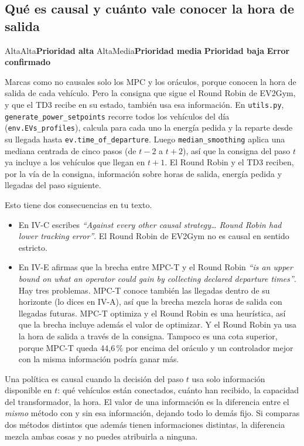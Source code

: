 \documentclass[11pt]{article}
\newcommand{\prioridad}[1]{%
  \def\tmpA{Alta}\def\tmpM{Media}\def\tmp{#1}%
  \ifx\tmp\tmpA\colorbox{rojoerror}{\color{white}\small\bfseries Prioridad alta}%
  \else\ifx\tmp\tmpM\colorbox{naranjatarea}{\color{white}\small\bfseries Prioridad media}%
  \else\colorbox{azulidea}{\color{white}\small\bfseries Prioridad baja}\fi\fi}
\newcommand{\confirmado}{\colorbox{rojoerror!15}{\small\bfseries\color{rojoerror} Error confirmado}}
\begin{document}
\subsection{Qué es causal y cuánto vale conocer la hora de salida}
\prioridad{Alta} \confirmado

\begin{error}
Marcas como no causales solo los MPC y los oráculos, porque conocen la hora de salida de cada vehículo. Pero la consigna que sigue el Round Robin de EV2Gym, y que el TD3 recibe en su estado, también usa esa información. En \texttt{utils.py}, \texttt{generate\_power\_setpoints} recorre todos los vehículos del día (\texttt{env.EVs\_profiles}), calcula para cada uno la energía pedida y la reparte desde su llegada hasta \texttt{ev.time\_of\_departure}. Luego \texttt{median\_smoothing} aplica una mediana centrada de cinco pasos (de $t-2$ a $t+2$), así que la consigna del paso $t$ ya incluye a los vehículos que llegan en $t+1$. El Round Robin y el TD3 reciben, por la vía de la consigna, información sobre horas de salida, energía pedida y llegadas del paso siguiente.
\end{error}

Esto tiene dos consecuencias en tu texto.
\begin{itemize}[leftmargin=1.2em]
\item En IV-C escribes \foreignlanguage{english}{\emph{``Against every other causal strategy\ldots{} Round Robin had lower tracking error''}}. El Round Robin de EV2Gym no es causal en sentido estricto.
\item En IV-E afirmas que la brecha entre MPC-T y el Round Robin \foreignlanguage{english}{\emph{``is an upper bound on what an operator could gain by collecting declared departure times''}}. Hay tres problemas. MPC-T conoce también las llegadas dentro de su horizonte (lo dices en IV-A), así que la brecha mezcla horas de salida con llegadas futuras. MPC-T optimiza y el Round Robin es una heurística, así que la brecha incluye además el valor de optimizar. Y el Round Robin ya usa la hora de salida a través de la consigna. Tampoco es una cota superior, porque MPC-T queda 44,6\,\% por encima del oráculo y un controlador mejor con la misma información podría ganar más.
\end{itemize}

\begin{idea}
Una política es causal cuando la decisión del paso $t$ usa solo información disponible en $t$: qué vehículos están conectados, cuánto han recibido, la capacidad del transformador, la hora. El valor de una información es la diferencia entre el \emph{mismo} método con y sin esa información, dejando todo lo demás fijo. Si comparas dos métodos distintos que además tienen informaciones distintas, la diferencia mezcla ambas cosas y no puedes atribuirla a ninguna.
\end{idea}
\end{document}
